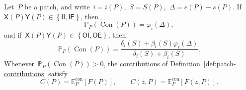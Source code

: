 \documentclass[EJP,preprint,NODS,nobera]{ejpecp}
\newcommand{\pP}{\mathbb{P}}
\newcommand{\E}{\mathbb{E}}
\newcommand{\bb}[1]{\left(#1\right)}
\newcommand{\Cb}[1]{\left[#1\right]}
\newcommand{\cb}[1]{\left\{#1\right\}}
\begin{document}
\begin{lemma}
\label{lem:contribution-formulas}
Let~$P$ be a patch, and write~$i=i(P)$,~$S=S(P)$,~$\Delta=e(P)-s(P)$. If
$\mathsf X(P)\mathsf Y(P)\in\cb{\mathsf{II},\mathsf{IE}}$, then
\begin{equation*}
\pP_P\bb{\operatorname{Con}(P)}
=
\varphi_i(\Delta),
\end{equation*}
and if~$\mathsf X(P)\mathsf Y(P)\in\cb{\mathsf{OI},\mathsf{OE}}$, then
\begin{equation*}
\pP_P\bb{\operatorname{Con}(P)}
=
\frac{
\delta_i(S)+\beta_i(S)\varphi_i(\Delta)
}{
\delta_i(S)+\beta_i(S)
}.
\end{equation*}
Whenever~$\pP_P\bb{\operatorname{Con}(P)}>0$, the contributions of
Definition~\ref{def:patch-contributions} satisfy
\begin{equation*}
C(P)=\E_P^{\mathrm{con}}\Cb{F(P)},
\qquad
C(z,P)=\E_P^{\mathrm{con}}\Cb{F(z,P)}.
\end{equation*}
\end{lemma}
\end{document}
